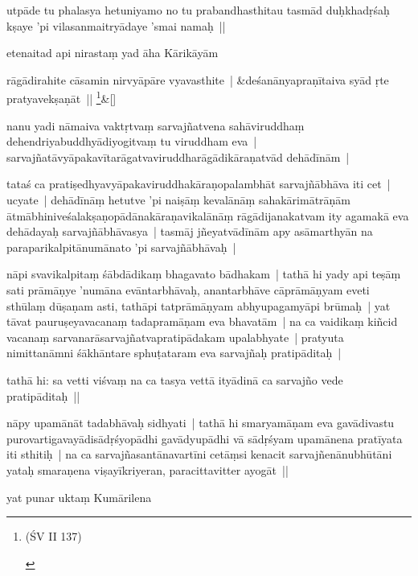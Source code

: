 \documentclass[article,a4paper]{memoir}
\begin{document}
	  \pstart utpā\-de tu phalasya hetuniyamo no tu prabandhasthitau tasmā\-d duḥkhadṛśaḥ kṣaye 'pi vilasanmaitryā\-daye 'smai namaḥ || 
	\pend
      

	  \pstart etenaitad api nirastaṃ yad ā\-ha Kā\-rikā\-yā\-m 
	\pend
      
	    
	    \stanza[\smallbreak]
rā\-gā\-dirahite cā\-samin nirvyā\-pā\-re vyavasthite | &deśanā\-nyapraṇī\-taiva syā\-d ṛte pratyavekṣaṇā\-t || \footnote{\begin{english}(ŚV II 137)\end{english}}\&[\smallbreak]


	

	  \pstart nanu yadi nā\-maiva vaktṛtvaṃ sarvajñatvena sahā\-viruddhaṃ dehendriyabuddhyā\-diyogitvaṃ tu viruddham eva | sarvajñatā\-vyā\-pakavī\-tarā\-gatvaviruddharā\-gā\-dikā\-raṇatvā\-d dehā\-dī\-nā\-m | 
	\pend
      

	  \pstart tataś ca pratiṣedhyavyā\-pakaviruddhakā\-raṇopalambhā\-t sarvajñā\-bhā\-va iti cet | ucyate | dehā\-dī\-nā\-ṃ hetutve 'pi naiṣā\-ṃ kevalā\-nā\-ṃ sahakā\-rimā\-trā\-ṇā\-m ā\-tmā\-bhiniveśalakṣaṇopā\-dā\-nakā\-raṇavikalā\-nā\-ṃ rā\-gā\-dijanakatvam ity agamakā\- eva dehā\-dayaḥ sarvajñā\-bhā\-vasya | tasmā\-j jñeyatvā\-dī\-nā\-m apy asā\-marthyā\-n na paraparikalpitā\-numā\-nato 'pi sarvajñā\-bhā\-vaḥ | 
	\pend
      

	  \pstart nā\-pi svavikalpitaṃ śā\-bdā\-dikaṃ bhagavato bā\-dhakam | tathā\- hi yady api teṣā\-ṃ sati prā\-mā\-ṇye 'numā\-na evā\-ntarbhā\-vaḥ, anantarbhā\-ve cā\-prā\-mā\-ṇyam eveti sthū\-laṃ dū\-ṣaṇam asti, tathā\-pi tatprā\-mā\-ṇyam abhyupagamyā\-pi brū\-maḥ | yat tā\-vat pauruṣeyavacanaṃ tadapramā\-ṇam eva bhavatā\-m | na ca vaidikaṃ kiñcid vacanaṃ sarvanarā\-sarvajñatvapratipā\-dakam upalabhyate | pratyuta nimittanā\-mni śā\-khā\-ntare sphuṭataram eva sarvajñaḥ pratipā\-ditaḥ | 
	\pend
      

	  \pstart tathā\- hi: sa vetti viśvaṃ na ca tasya vettā\- ityā\-dinā\- ca sarvajño vede pratipā\-ditaḥ || 
	\pend
      

	  \pstart nā\-py upamā\-nā\-t tadabhā\-vaḥ sidhyati | tathā\- hi smaryamā\-ṇam eva gavā\-divastu purovartigavayā\-disā\-dṛśyopā\-dhi gavā\-dyupā\-dhi vā\- sā\-dṛśyam upamā\-nena pratī\-yata iti sthitiḥ | na ca sarvajñasantā\-navartī\-ni cetā\-ṃsi kenacit sarvajñenā\-nubhū\-tā\-ni yataḥ smaraṇena viṣayī\-kriyeran, paracittavitter ayogā\-t || 
	\pend
      

	  \pstart yat punar uktaṃ Kumā\-rilena 
	\pend
      
\end{document}

